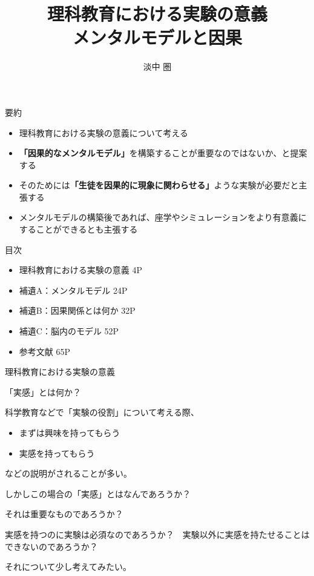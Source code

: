 \documentclass[12pt, unicode]{beamer}
\title{理科教育における実験の意義 \\ メンタルモデルと因果}
\author{淡中 圏}
\date{}
\begin{document}
\frame{\titlepage}

\begin{frame}{要約}
\begin{itemize}
\item 理科教育における実験の意義について考える
\item \textbf{「因果的なメンタルモデル」}を構築することが重要なのではないか、と提案する
\item そのためには\textbf{「生徒を因果的に現象に関わらせる」}ような実験が必要だと主張する
\item メンタルモデルの構築後であれば、座学やシミュレーションをより有意義にすることができるとも主張する
\end{itemize}
\end{frame}

\begin{frame}{目次}
\begin{itemize}
\item 理科教育における実験の意義 4P
\item 補遺A：メンタルモデル 24P
\item 補遺B：因果関係とは何か 32P
\item 補遺C：脳内のモデル 52P
\item 参考文献 65P
\end{itemize}
\end{frame}

\begin{frame}
{\LARGE 理科教育における実験の意義}
\end{frame}

\begin{frame}{「実感」とは何か？}

科学教育などで「実験の役割」について考える際、

\begin{itemize}
\item まずは興味を持ってもらう
\item 実感を持ってもらう
\end{itemize}

などの説明がされることが多い。

しかしこの場合の「実感」とはなんであろうか？

それは重要なものであろうか？

実感を持つのに実験は必須なのであろうか？　実験以外に実感を持たせることはできないのであろうか？

それについて少し考えてみたい。

\end{frame}
\end{document}
